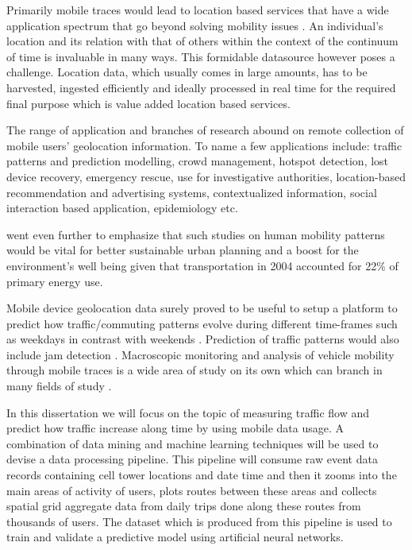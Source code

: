 \documentclass[12pt, a4paper]{report}
\theoremstyle{definition}
\theoremstyle{definition}%
\theoremstyle{definition}%
\theoremstyle{definition}%
\theoremstyle{definition}%
\theoremstyle{definition}%
\begin{document}
Primarily mobile traces would lead to location based services that have a wide application spectrum that go beyond solving mobility issues \cite{Hoteit2014,Calabrese2013,Gonzalez2008,Hoteit2016}. An individual's location and its relation with that of others within the context of the continuum of time is invaluable in many ways. This formidable datasource however poses a challenge. Location data, which usually comes in large amounts, has to be harvested, ingested efficiently and ideally processed in real time for the required final purpose which is value added location based services.

The range of application and branches of research abound on remote collection of mobile users' geolocation information.   To name a few applications include: traffic patterns and prediction modelling, crowd management, hotspot detection, lost device recovery, emergency rescue, use for investigative authorities,  location-based recommendation and advertising systems, contextualized information, social interaction based application, epidemiology etc.  

\cite{Calabrese2013} went even further to emphasize that such studies on human mobility patterns would be vital for better sustainable urban planning and a boost for the environment's well being given that transportation in 2004 accounted for 22\% of primary energy use.

Mobile device geolocation data surely proved to be useful to setup a platform to predict how traffic/commuting patterns evolve during different time-frames such as weekdays in contrast with weekends \cite{Steenbruggen2015}. Prediction of traffic patterns would also include jam detection \cite{Hoteit2014}.  Macroscopic monitoring and analysis of vehicle mobility through mobile traces is a wide area of study on its own which can branch in many fields of study \cite{Steenbruggen2015}. 

In this dissertation we will focus on the topic of measuring traffic flow and predict how traffic increase along time by using mobile data usage. A combination of data mining and machine learning techniques will be used to devise a data processing pipeline. This pipeline will consume raw event data records containing cell tower locations and date time and then it zooms into the main areas of activity of users, plots routes between these areas and collects spatial grid aggregate data from daily trips done along these routes from thousands of users. The dataset which is produced from this pipeline is used to train and validate a predictive model using artificial neural networks.
\end{document}
